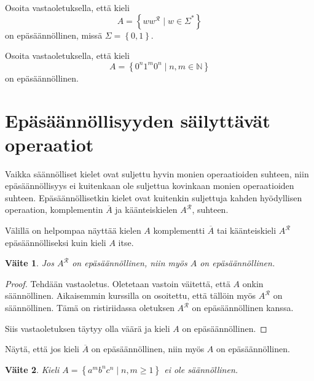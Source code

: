 \documentclass[a4paper,11pt]{article}
\newtheorem*{claim}{Väite}
\theoremstyle{definition}
\newcommand{\set}[1]{{\left\{ #1 \right\}}}
\newcommand{\Nat}{\mathbb{N}}
\begin{document}
\begin{exercise}
    Osoita vastaoletuksella, että kieli
    \begin{equation*}
        A = \set{ww^{\mathcal{R}} \mid w \in \Sigma^*}
    \end{equation*}
    on epäsäännöllinen, missä $\Sigma = \set{0,1}$.
\end{exercise}

\begin{exercise}
    Osoita vastaoletuksella, että kieli
    \begin{equation*}
        A = \set{0^n1^m0^n \mid n,m \in \Nat}
    \end{equation*}
    on epäsäännöllinen.
\end{exercise}

\section*{Epäsäännöllisyyden säilyttävät operaatiot}

Vaikka säännölliset kielet ovat suljettu hyvin monien operaatioiden suhteen,
niin epäsäännöllisyys ei kuitenkaan ole suljettua kovinkaan monien
operaatioiden suhteen. Epäsään\-nöl\-lisetkin kielet ovat kuitenkin suljettuja
kahden hyödyllisen operaation, komplementin $\overline{A}$ ja käänteiskielen
$A^\mathcal{R}$, suhteen.

Välillä on helpompaa näyttää kielen $A$ komplementti $\overline{A}$ tai
käänteiskieli $A^\mathcal{R}$ epäsäännölliseksi kuin kieli $A$ itse.

\begin{claim}
    Jos $A^\mathcal{R}$ on epäsäännöllinen, niin myös $A$ on
    epä\-sään\-nöl\-li\-nen.
\end{claim}
\begin{proof}
    Tehdään vastaoletus. Oletetaan vastoin väitettä, et\-tä $A$ onkin
    säännöllinen. Aikaisemmin kurssilla on osoitettu, että tällöin myös
    $A^\mathcal{R}$ on säännöllinen. Tämä on ristiriidassa oletuksen
    $A^\mathcal{R}$ on epäsäännöllinen kanssa.

    Siis vastaoletuksen täytyy olla väärä ja kieli $A$ on epä\-sään\-nöl\-li\-nen.
\end{proof}

\begin{exercise}
    Näytä, että jos kieli $\overline{A}$ on epä\-sään\-nöl\-li\-nen, niin myös $A$ on
    epäsäännöllinen.
\end{exercise}

\begin{claim}
    Kieli $A = \set{a^m b^n c^n \mid n,m\geq 1}$ ei ole säännöllinen.
\end{claim}
\end{document}

